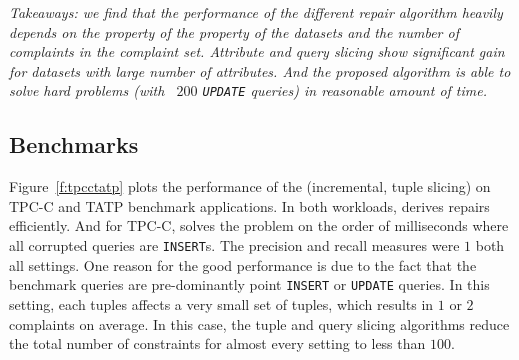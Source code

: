 % 

\smallskip

\textit{Takeaways: we find that the performance of the different repair algorithm 
heavily depends on the property of the property of the datasets and the 
number of complaints in the complaint set. Attribute and query slicing show significant gain for 
datasets with large number of attributes. And the proposed \sys algorithm is able to solve hard problems
(with ~$200$ \texttt{UPDATE} queries) in reasonable amount of time. }













\subsection{Benchmarks}
\label{sec:experiments:benchmark}

Figure~\ref{f:tpcctatp} plots the performance of the \sys (incremental, tuple slicing)
on TPC-C and TATP benchmark applications.  In both workloads, \sys derives repairs efficiently.
And for TPC-C, \sys solves the problem on the order of milliseconds where all corrupted queries are \texttt{INSERT}s. 
The precision and recall measures were
$1$ both all settings.   One reason for the good performance is due to the fact that the benchmark queries
are pre-dominantly point \texttt{INSERT} or \texttt{UPDATE} queries.  In this setting, each tuples affects a very small set of 
tuples, which results in $1$ or $2$ complaints on average.  In this case, the tuple and query slicing algorithms
reduce the total number of constraints for almost every setting to less than $100$.


